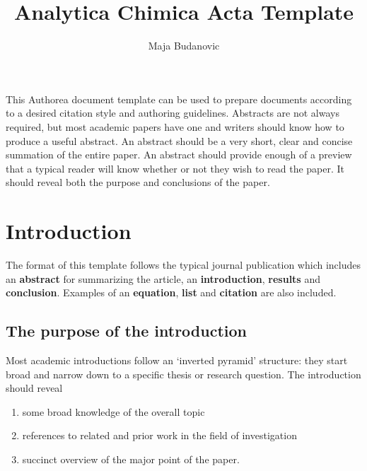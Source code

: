 \documentclass{article}
\renewenvironment{abstract}
  {{\bfseries\noindent{\abstractname}\par\nobreak}\footnotesize}
  {\bigskip}
\providecommand{\tightlist}{\setlength{\itemsep}{0pt}\setlength{\parskip}{0pt}}%
\begin{document}
\title{Analytica Chimica Acta Template}


\author[ ]{Maja Budanovic}

\affil[ ]{}
\vspace{-1em}


\date{}

\begingroup
\let\center\flushleft
\let\endcenter\endflushleft
\maketitle
\endgroup

\begin{abstract}
{This Authorea document template can be used to prepare documents
according to a desired citation style and authoring guidelines.
Abstracts are not always required, but most academic papers have one and
writers should know how to produce a useful abstract. An abstract should
be a very short, clear and concise summation of the entire paper. An
abstract should provide enough of a preview that a typical reader will
know whether or not they wish to read the paper. It should reveal both
the purpose and conclusions of the paper.}\\%
\end{abstract}%



\section*{Introduction}\label{introduction}

The format of this template follows the typical journal publication
which includes an \textbf{abstract} for summarizing the article, an
\textbf{introduction}, \textbf{results} and \textbf{conclusion}.
Examples of an \textbf{equation}, \textbf{list} and \textbf{citation}
are also included.~\\

\subsection*{The purpose of the
introduction}\label{the-purpose-of-the-introduction}

Most academic introductions follow an `inverted pyramid' structure: they
start broad and narrow down to a specific thesis or research question.
The introduction should reveal\\

\begin{enumerate}
\tightlist
\item
  some broad knowledge of the overall topic\\
\item
  references to related and prior work in the field of investigation\\
\item
  succinct overview of the major point of the paper.\\
\end{enumerate}
\end{document}
